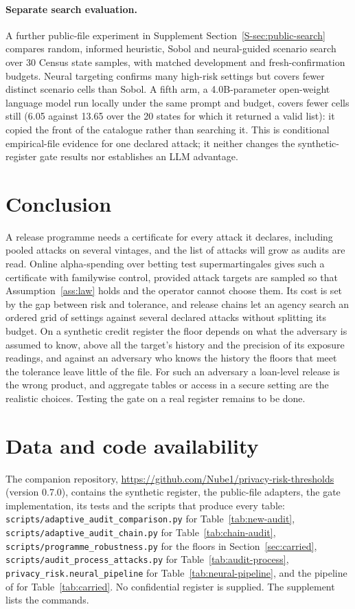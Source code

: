 \documentclass{jpc}
\theoremstyle{remark}
\begin{document}
\paragraph{Separate search evaluation.} A further public-file experiment in Supplement Section~\ref{S-sec:public-search} compares random, informed heuristic, Sobol and neural-guided scenario search over 30 Census state samples, with matched development and fresh-confirmation budgets. Neural targeting confirms many high-risk settings but covers fewer distinct scenario cells than Sobol. A fifth arm, a 4.0B-parameter open-weight language model run locally under the same prompt and budget, covers fewer cells still (6.05 against 13.65 over the 20 states for which it returned a valid list): it copied the front of the catalogue rather than searching it. This is conditional empirical-file evidence for one declared attack; it neither changes the synthetic-register gate results nor establishes an LLM advantage.

\section{Conclusion}\label{sec:conclusion}
A release programme needs a certificate for every attack it declares, including pooled attacks on several vintages, and the list of attacks will grow as audits are read. Online alpha-spending over betting test supermartingales gives such a certificate with familywise control, provided attack targets are sampled so that Assumption~\ref{ass:law} holds and the operator cannot choose them. Its cost is set by the gap between risk and tolerance, and release chains let an agency search an ordered grid of settings against several declared attacks without splitting its budget. On a synthetic credit register the floor depends on what the adversary is assumed to know, above all the target's history and the precision of its exposure readings, and against an adversary who knows the history the floors that meet the tolerance leave little of the file. For such an adversary a loan-level release is the wrong product, and aggregate tables or access in a secure setting are the realistic choices. Testing the gate on a real register remains to be done.

\section*{Data and code availability}
The companion repository, \url{https://github.com/Nube1/privacy-risk-thresholds} (version 0.7.0), contains the synthetic register, the public-file adapters, the gate implementation, its tests and the scripts that produce every table: \nolinkurl{scripts/adaptive_audit_comparison.py} for Table~\ref{tab:new-audit}, \nolinkurl{scripts/adaptive_audit_chain.py} for Table~\ref{tab:chain-audit}, \nolinkurl{scripts/programme_robustness.py} for the floors in Section~\ref{sec:carried}, \nolinkurl{scripts/audit_process_attacks.py} for Table~\ref{tab:audit-process}, \nolinkurl{privacy_risk.neural_pipeline} for Table~\ref{tab:neural-pipeline}, and the pipeline of \cite{mahomane2026} for Table~\ref{tab:carried}. No confidential register is supplied. The supplement lists the commands.
\end{document}

